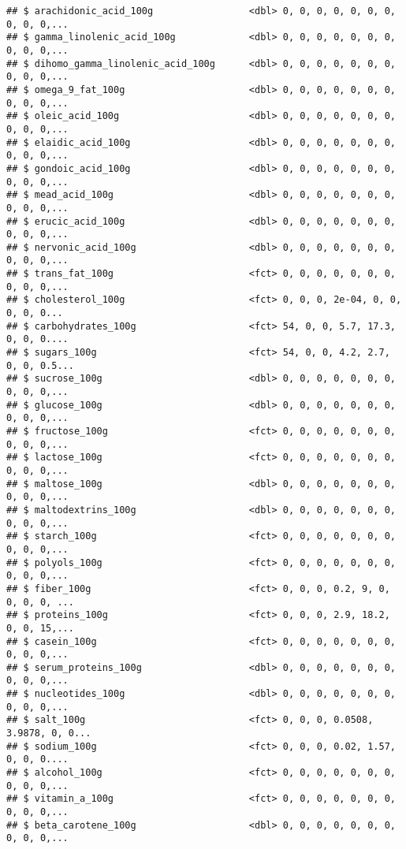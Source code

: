 \documentclass[]{article}
\begin{document}
\begin{verbatim}
## $ arachidonic_acid_100g                 <dbl> 0, 0, 0, 0, 0, 0, 0, 0, 0, 0,...
## $ gamma_linolenic_acid_100g             <dbl> 0, 0, 0, 0, 0, 0, 0, 0, 0, 0,...
## $ dihomo_gamma_linolenic_acid_100g      <dbl> 0, 0, 0, 0, 0, 0, 0, 0, 0, 0,...
## $ omega_9_fat_100g                      <dbl> 0, 0, 0, 0, 0, 0, 0, 0, 0, 0,...
## $ oleic_acid_100g                       <dbl> 0, 0, 0, 0, 0, 0, 0, 0, 0, 0,...
## $ elaidic_acid_100g                     <dbl> 0, 0, 0, 0, 0, 0, 0, 0, 0, 0,...
## $ gondoic_acid_100g                     <dbl> 0, 0, 0, 0, 0, 0, 0, 0, 0, 0,...
## $ mead_acid_100g                        <dbl> 0, 0, 0, 0, 0, 0, 0, 0, 0, 0,...
## $ erucic_acid_100g                      <dbl> 0, 0, 0, 0, 0, 0, 0, 0, 0, 0,...
## $ nervonic_acid_100g                    <dbl> 0, 0, 0, 0, 0, 0, 0, 0, 0, 0,...
## $ trans_fat_100g                        <fct> 0, 0, 0, 0, 0, 0, 0, 0, 0, 0,...
## $ cholesterol_100g                      <fct> 0, 0, 0, 2e-04, 0, 0, 0, 0, 0...
## $ carbohydrates_100g                    <fct> 54, 0, 0, 5.7, 17.3, 0, 0, 0....
## $ sugars_100g                           <fct> 54, 0, 0, 4.2, 2.7, 0, 0, 0.5...
## $ sucrose_100g                          <dbl> 0, 0, 0, 0, 0, 0, 0, 0, 0, 0,...
## $ glucose_100g                          <dbl> 0, 0, 0, 0, 0, 0, 0, 0, 0, 0,...
## $ fructose_100g                         <fct> 0, 0, 0, 0, 0, 0, 0, 0, 0, 0,...
## $ lactose_100g                          <fct> 0, 0, 0, 0, 0, 0, 0, 0, 0, 0,...
## $ maltose_100g                          <dbl> 0, 0, 0, 0, 0, 0, 0, 0, 0, 0,...
## $ maltodextrins_100g                    <dbl> 0, 0, 0, 0, 0, 0, 0, 0, 0, 0,...
## $ starch_100g                           <fct> 0, 0, 0, 0, 0, 0, 0, 0, 0, 0,...
## $ polyols_100g                          <fct> 0, 0, 0, 0, 0, 0, 0, 0, 0, 0,...
## $ fiber_100g                            <fct> 0, 0, 0, 0.2, 9, 0, 0, 0, 0, ...
## $ proteins_100g                         <fct> 0, 0, 0, 2.9, 18.2, 0, 0, 15,...
## $ casein_100g                           <fct> 0, 0, 0, 0, 0, 0, 0, 0, 0, 0,...
## $ serum_proteins_100g                   <dbl> 0, 0, 0, 0, 0, 0, 0, 0, 0, 0,...
## $ nucleotides_100g                      <dbl> 0, 0, 0, 0, 0, 0, 0, 0, 0, 0,...
## $ salt_100g                             <fct> 0, 0, 0, 0.0508, 3.9878, 0, 0...
## $ sodium_100g                           <fct> 0, 0, 0, 0.02, 1.57, 0, 0, 0....
## $ alcohol_100g                          <fct> 0, 0, 0, 0, 0, 0, 0, 0, 0, 0,...
## $ vitamin_a_100g                        <fct> 0, 0, 0, 0, 0, 0, 0, 0, 0, 0,...
## $ beta_carotene_100g                    <dbl> 0, 0, 0, 0, 0, 0, 0, 0, 0, 0,...

\end{verbatim}
\end{document}
